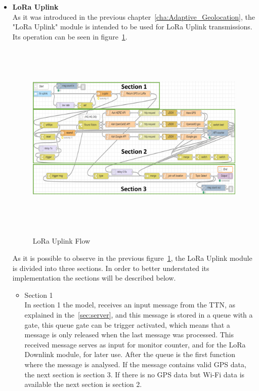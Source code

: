 \begin{itemize}
   \item \textbf{LoRa Uplink} \\
   As it was introduced in the previous chapter~\ref{cha:Adaptive_Geolocation}, the "LoRa Uplink" module is intended to be used for LoRa Uplink transmissions. Its operation can be seen in figure~\ref{fig:LoRa_Uplink}.
\begin{figure}[htbp]
  \centering
  
    {\includegraphics[height=9.3cm,width=0.9\linewidth]{Chapters/Figures/LoRaUplinkFlow.pdf}}
 
  \caption{LoRa Uplink Flow}
  \label{fig:LoRa_Uplink}
\end{figure}
 
As it is possible to observe in the previous figure~\ref{fig:LoRa_Uplink}, the LoRa Uplink module is divided into three sections. In order to better understated its implementation the sections will be described below.

\begin{itemize}
  \item Section 1\\
    In section 1 the model, receives an input message from the TTN, as explained in the~\ref{sec:server}, and this message is stored in a queue with a gate, this queue gate can be trigger activated, which means that a message is only released when the last message was processed. This received message serves as input for monitor counter, and for the LoRa Downlink module, for later use. After the queue is the first function where the message is analysed. If the message contains valid GPS data, the next section is section 3. If there is no GPS data but Wi-Fi data is available the next section is section 2. 
   

\end{itemize}
\end{itemize}
